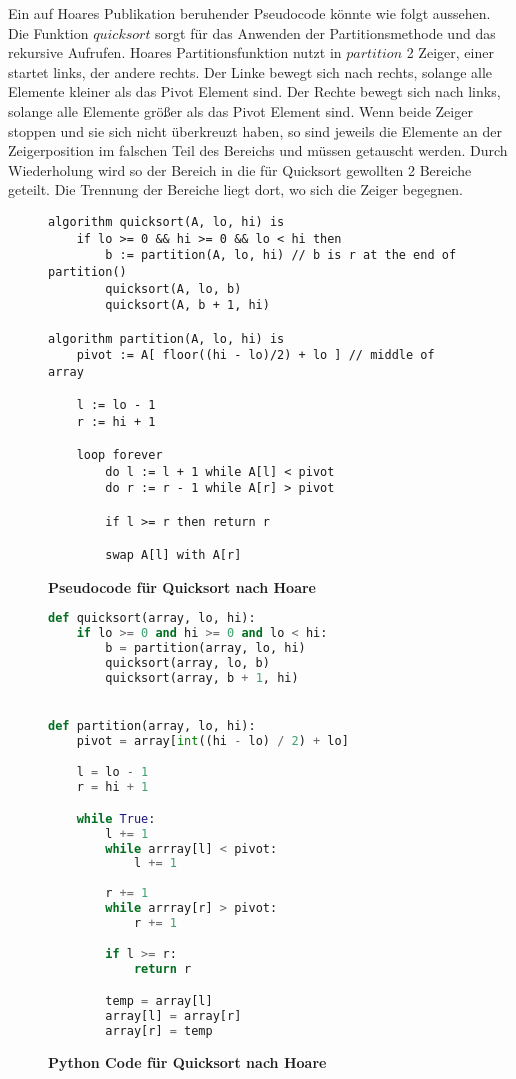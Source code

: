 Ein auf Hoares Publikation beruhender Pseudocode könnte wie folgt aussehen.
Die Funktion $quicksort$ sorgt für das Anwenden der Partitionsmethode und das rekursive
Aufrufen. Hoares Partitionsfunktion nutzt in $partition$ 2 Zeiger, einer startet links,
der andere rechts. Der Linke bewegt sich nach rechts, solange alle Elemente kleiner
als das Pivot Element sind. Der Rechte bewegt sich nach links, solange alle Elemente
größer als das Pivot Element sind. Wenn beide Zeiger stoppen und sie sich nicht überkreuzt
haben, so sind jeweils die Elemente an der Zeigerposition im falschen Teil des Bereichs und
müssen getauscht werden. Durch Wiederholung wird so der Bereich in die für Quicksort gewollten
2 Bereiche geteilt. Die Trennung der Bereiche liegt dort, wo sich die Zeiger begegnen.

\begin{figure}[H]
\begin{lstlisting}
algorithm quicksort(A, lo, hi) is 
    if lo >= 0 && hi >= 0 && lo < hi then
        b := partition(A, lo, hi) // b is r at the end of partition()
        quicksort(A, lo, b)
        quicksort(A, b + 1, hi) 

algorithm partition(A, lo, hi) is 
    pivot := A[ floor((hi - lo)/2) + lo ] // middle of array

    l := lo - 1
    r := hi + 1

    loop forever 
        do l := l + 1 while A[l] < pivot
        do r := r - 1 while A[r] > pivot

        if l >= r then return r

        swap A[l] with A[r]
\end{lstlisting}
\caption{\textbf{Pseudocode für Quicksort nach Hoare}}
\end{figure}

\begin{figure}[H]
\begin{lstlisting}[language=python]
def quicksort(array, lo, hi):
    if lo >= 0 and hi >= 0 and lo < hi:
        b = partition(array, lo, hi)
        quicksort(array, lo, b)
        quicksort(array, b + 1, hi)


def partition(array, lo, hi):
    pivot = array[int((hi - lo) / 2) + lo]

    l = lo - 1
    r = hi + 1

    while True:
        l += 1
        while arrray[l] < pivot:
            l += 1
        
        r += 1
        while arrray[r] > pivot:
            r += 1

        if l >= r:
            return r

        temp = array[l]
        array[l] = array[r]
        array[r] = temp
\end{lstlisting}
\caption{\textbf{Python Code für Quicksort nach Hoare}}
\end{figure}

